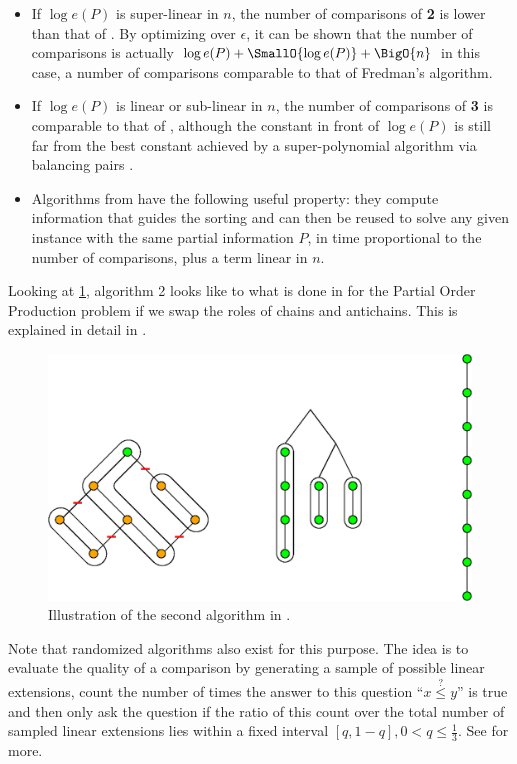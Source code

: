 \begin{itemize}

\item If $\log e(P)$ is super-linear in $n$, the number of comparisons of \cite{cardinal2013sorting} \textbf{2} is lower than that of \cite{kahnkim1}. By optimizing over $\epsilon$, it can be shown that the number of comparisons is actually $\log e(P) + \SmallO{\log e(P)} + \BigO{n}$ in this case, a number of comparisons comparable to that of Fredman’s algorithm.

\item If $\log e(P)$ is linear or sub-linear in $n$, the number of comparisons of \cite{cardinal2013sorting} \textbf{3} is comparable to that of \cite{kahnkim1}, although the constant in front of $\log e(P)$ is still far from the best constant achieved by a super-polynomial algorithm via balancing pairs \cite{brightwell1995balancing, brightwell1999balanced}.

\item Algorithms from \cite{cardinal2013sorting} have the following useful property: they compute information that guides the sorting and can then be reused to solve any given instance with the same partial information $P$, in time proportional to the number of comparisons, plus a term linear in $n$.

\end{itemize}


Looking at \ref{fig:supi/alg2}, algorithm 2 looks like to what is done in \cite{jcardin1} for the Partial Order Production problem if we swap the roles of chains and antichains. This is explained in detail in \cite{DBLP:conf/birthday/CardinalF13}.


\begin{figure}
	\centering
	\includegraphics[height=0.2\textheight]{fig/supi/reduction:diag}
	\caption{\label{fig:supi/alg2} Illustration of the second algorithm in \cite{cardinal2013sorting}.}
\end{figure}


Note that randomized algorithms also exist for this purpose. The idea is to evaluate the quality of a comparison by generating a sample of possible linear extensions, count the number of times the answer to this question ``$x \stackrel{?}{\le} y$'' is true and then only ask the question if the ratio of this count over the total number of sampled linear extensions lies within a fixed interval $[q, 1-q], 0 < q \le \frac{1}{3}$. See \cite{huber2006fast} for more.

